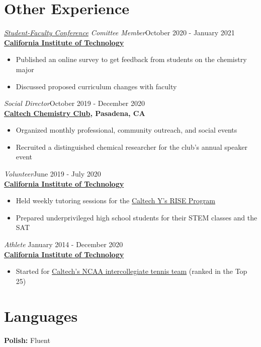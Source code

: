 \documentclass[margin,line]{resume}
\begin{document}
\begin{resume}
\newpage
\section{\mysidestyle Other Experience}
{\sl \href{https://sfc.caltech.edu/}{Student-Faculty Conference} Comittee Member}\hfill October 2020 - January 2021\\
\textbf{\href{https://www.caltech.edu/}{California Institute of Technology}}
\begin{itemize}
\item Published an online survey to get feedback from students on the chemistry major
\item Discussed proposed curriculum changes with faculty
\end{itemize}
{\sl Social Director}\hfill October 2019 - December 2020\\
\textbf{\href{https://cce.caltech.edu/undergraduate/caltech-chemistry-club}{Caltech Chemistry Club}, Pasadena, CA}
\begin{itemize}
\item Organized monthly professional, community outreach, and social events
\item Recruited a distinguished chemical researcher for the club's annual speaker event
\end{itemize}
{\sl Volunteer}\hfill June 2019 - July 2020\\
\textbf{\href{https://www.caltech.edu/}{California Institute of Technology}}
\begin{itemize}
\item Held weekly tutoring sessions for the \href{https://www.caltechy.org/rise-tutor}{Caltech Y's RISE Program}
\item Prepared underprivileged high school students for their STEM classes and the SAT
\end{itemize}
{\sl Athlete} \hfill January 2014 - December 2020\\
\textbf{\href{https://www.caltech.edu/}{California Institute of Technology}}
\begin{itemize}
\item Started for \href{https://gocaltech.com/sports/mens-tennis}{Caltech's NCAA intercollegiate tennis team} (ranked in the Top 25)
\end{itemize}

\section{\mysidestyle Languages}
\textbf{Polish: }\textnormal{Fluent}


\end{resume}   
\end{document}
